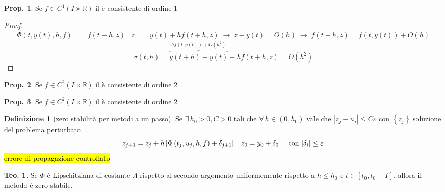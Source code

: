 \documentclass[a4paper,10pt]{article}
\theoremstyle{definition}
\theoremstyle{indentdefinition}
\newtheorem{defn}{Definizione}[section]
\theoremstyle{indenttheorem}
\newtheorem{thm}{Teo.}
\newtheorem{prop}{Prop.}
\theoremstyle{myremark}
\theoremstyle{indentgeneral}
\theoremstyle{plain}
\theoremstyle{plain}
\newenvironment{myboxed} 
{\noindent\begin{lrbox}{\mybox}\begin{minipage}{\textwidth}}
{\end{minipage}\end{lrbox}\fbox{\usebox{\mybox}}}
\begin{document}
\begin{myboxed}
\begin{prop}
Se $f\in C^{1}\left(I\times\mathbb{R}\right)$ il 
è consistente di ordine $1$
\end{prop}
\end{myboxed}

\begin{proof}
\begin{align*}
\Phi\left(t,y\left(t\right),h,f\right) & =f\left(t+h,z\right) & z & =y\left(t\right)+hf\left(t+h,z\right)\;\rightarrow\;z-y\left(t\right)=O\left(h\right)\;\rightarrow\;f\left(t+h,z\right)=f\left(t,y\left(t\right)\right)+O\left(h\right)
\end{align*}
\[
\sigma\left(t,h\right)=\overset{hf\left(t,y\left(t\right)\right)+O\left(h^{2}\right)}{\overbrace{y\left(t+h\right)-y\left(t\right)}}-hf\left(t+h,z\right)=O\left(h^{2}\right)
\]
\end{proof}

\begin{myboxed}
\begin{prop}
Se $f\in C^{2}\left(I\times\mathbb{R}\right)$ il 
è consistente di ordine $2$
\end{prop}
\end{myboxed}

\begin{prop}
Se $f\in C^{2}\left(I\times\mathbb{R}\right)$ il 
è consistente di ordine $2$
\end{prop}

\begin{defn}[zero stabilità per metodi a un passo]
Se $\exists\,h_{0}>0,C>0$ tali che $\forall\,h\in\left(0,h_{0}\right)$
vale che $\left|z_{j}-u_{j}\right|\leq C\varepsilon$ con $\left\{ z_{j}\right\} $
soluzione del problema perturbato
\begin{align*}
z_{j+1} & =z_{j}+h\left[\Phi\left(t_{j},u_{j},h,f\right)+\delta_{j+1}\right] & z_{0} & =y_{0}+\delta_{0} & \text{ con \ensuremath{\left|\delta_{i}\right|\leq\varepsilon}}
\end{align*}
\hl{errore di propagazione controllato}
\end{defn}

\begin{thm}
\label{thm:condizione-zero-stabilita}Se $\Phi$ è Lipschitziana di
costante $\Lambda$ rispetto al secondo argomento uniformemente rispetto
a $h\leq h_{0}$ e $t\in\left[t_{0},t_{0}+T\right]$, allora il metodo
è zero-stabile.
\end{thm}
\end{document}

